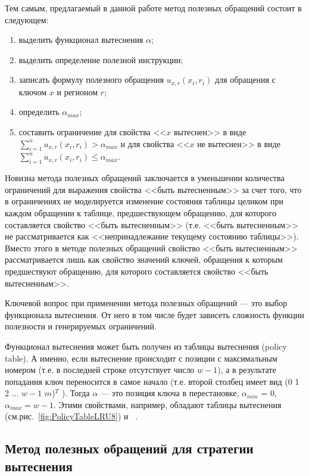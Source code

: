 Тем самым, предлагаемый в данной работе метод полезных обращений состоит в следующем:
\begin{enumerate}
  \item выделить функционал вытеснения $\alpha$;
  \item выделить определение полезной инструкции;
  \item записать формулу полезного обращения $u_{x,r}(x_i, r_i)$ для обращения с ключом $x$ и регионом $r$;
  \item определить $\alpha_{max}$;
  \item составить ограничение для свойства <<$x$ вытеснен>> в виде
$\sum\limits_{i=1}^n u_{x,r}(x_i, r_i) > \alpha_{max}$ и для свойства <<$x$ не
вытеснен>> в виде $\sum\limits_{i=1}^n u_{x,r}(x_i,r_i) \leqslant \alpha_{max}$.
\end{enumerate}

Новизна метода полезных обращений заключается в уменьшении количества ограничений для выражения свойства <<быть вытесненным>> за счет того, что в ограничениях не моделируется изменение состояния таблицы целиком при каждом обращении к таблице, предшествующем обращению, для которого составляется свойство <<быть вытесненным>> (т.е. <<быть вытесненным>> не рассматривается как <<непринадлежание текущему состоянию таблицы>>). Вместо этого в методе полезных обращений свойство <<быть вытесненным>> рассматривается лишь как свойство значений ключей, обращения к которым предшествуют обращению, для которого составляется свойство <<быть вытесненным>>.

Ключевой вопрос при применении метода полезных обращений --- это выбор функционала вытеснения. От него в том числе будет зависеть сложность функции полезности и генерируемых ограничений.

 Функционал вытеснения может быть получен из таблицы вытеснения (policy table). А именно, если вытеснение происходит с позиции с максимальным номером (т.е. в последней строке отсутствует число $w{-}1$), а в результате попадания ключ переносится в самое начало (т.е. второй столбец имеет вид (0 1 2 ... $w{-}1$ $m$)$^T$ ). Тогда $\alpha$ --- это позиция ключа в перестановке, $\alpha_{min}$ = 0, $\alpha_{max} = w{-}1$. Этими свойствами, например, обладают таблицы вытеснения \LRU (см.рис.~\ref{fig:PolicyTableLRU8}) и \PseudoLRU~\cite{policy_tables}.


\subsection{Метод полезных обращений для стратегии вытеснения \LRU}

